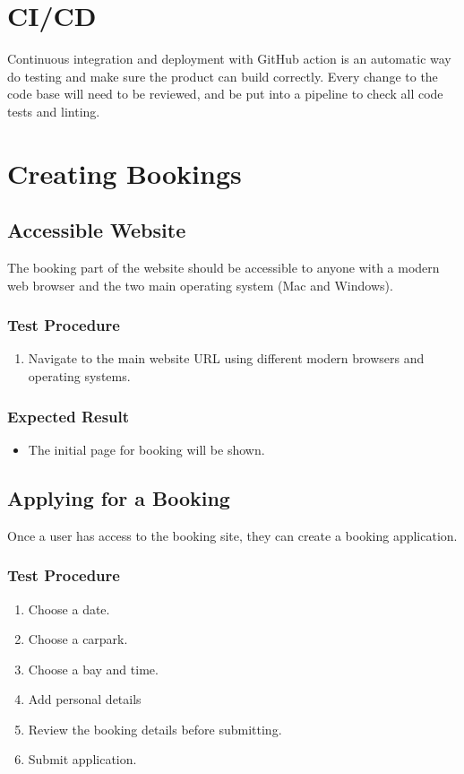 \documentclass[a4paper, draft]{article}
\begin{document}
\section{CI/CD}
Continuous integration and deployment with GitHub action is an automatic way do testing and make sure the product can build correctly. Every change to the code base will need to be reviewed, and be put into a pipeline to check all code tests and linting. 

\newpage
\section{Creating Bookings}
\subsection{Accessible Website}
The booking part of the website should be accessible to anyone with a modern web browser and the two main operating system (Mac and Windows).

\subsubsection{Test Procedure}
\begin{enumerate}
  \item Navigate to the main website URL using different modern browsers and operating systems.
\end{enumerate}

\subsubsection{Expected Result}
\begin{itemize}
  \item The initial page for booking will be shown.
\end{itemize}

\subsection{Applying for a Booking}
Once a user has access to the booking site, they can create a booking application.

\subsubsection{Test Procedure}
\begin{enumerate}
  \item Choose a date.
  \item Choose a carpark.
  \item Choose a bay and time.
  \item Add personal details
  \item Review the booking details before submitting.
  \item Submit application.
\end{enumerate}
\end{document}
